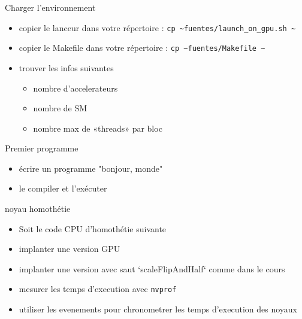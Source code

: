 \documentclass[11pt,mathserif]{beamer}
\begin{document}
\begin{frame}{Charger l'environnement}
\begin{itemize}
  \item copier le lanceur dans votre répertoire : \lstinline$cp ~fuentes/launch_on_gpu.sh ~$
  \item copier le Makefile dans votre répertoire : \lstinline$cp ~fuentes/Makefile ~$

  \item trouver les infos suivantes
  \begin{itemize}
    \item nombre d'accelerateurs
    \item nombre de SM
    \item nombre max de «threads» par bloc
  \end{itemize}
\end{itemize}
\end{frame}
\begin{frame}{Premier programme}
\begin{itemize}
  \item écrire un programme "bonjour, monde"

  \item le compiler et l'exécuter

\end{itemize}
\end{frame}
\begin{frame}{noyau homothétie}
\begin{itemize}[<+->]
  \item Soit le code CPU d'homothétie suivante

  \item implanter une version GPU
  \item implanter une version avec saut `scaleFlipAndHalf` comme dans le cours
  \item mesurer les temps d'execution avec {\tt nvprof }
  \item utiliser les evenements pour chronometrer les temps d'execution des noyaux
\end{itemize}
\end{frame}
\end{document}
